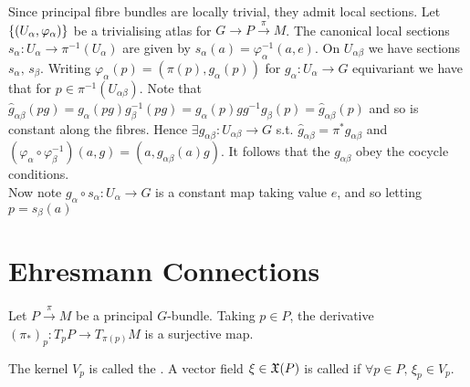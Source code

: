 \documentclass{article}
\begin{document}
Since principal fibre bundles are locally trivial, they admit local sections. Let $\left\{ (U_\alpha, \varphi_\alpha) \right\}$ be a trivialising atlas for $G \to P \overset{\pi}{\to} M$. The canonical local sections $s_\alpha : U_\alpha \to \pi^{-1}(U_\alpha)$ are given by $s_\alpha(a) = \varphi_\alpha^{-1}(a,e)$. On $U_{\alpha\beta}$ we have sections $s_\alpha, \, s_\beta$. Writing $\varphi_\alpha(p) = (\pi(p),g_\alpha(p))$ for $g_\alpha: U_\alpha \to G$ equivariant we have that for $p\in \pi^{-1}(U_{\alpha\beta})$.
Note that $\hat{g}_{\alpha\beta}(pg) = g_\alpha(pg) g_\beta^{-1}(pg) = g_\alpha(p)  g g^{-1} g_\beta(p) = \hat{g}_{\alpha\beta}(p)$ and so is constant along the fibres. Hence $\exists g_{\alpha\beta}:U_{\alpha\beta} \to G $ s.t. $\hat{g}_{\alpha\beta} = \pi^\ast g_{\alpha\beta}$ and $(\varphi_\alpha \circ \varphi_\beta^{-1})(a,g) = (a,g_{\alpha\beta}(a)g)$. It follows that the $g_{\alpha\beta}$ obey the cocycle conditions. \\
Now note $g_\alpha \circ s_\alpha : U_\alpha \to G$ is a constant map taking value $e$, and so letting $p = s_\beta(a)$
\section{Ehresmann Connections}
Let $P \overset{\pi}{\to} M$ be a principal $G$-bundle. Taking $p \in P$, the derivative $(\pi_\ast)_p : T_p P \to T_{\pi(p)}M$ is a surjective map. 
\begin{definition}
The kernel $V_p$ is called the . A vector field $\xi \in \mathfrak{X}(P)$ is called  if $\forall p \in P, \, \xi_p \in V_p$. 
\end{definition}
\end{document}
